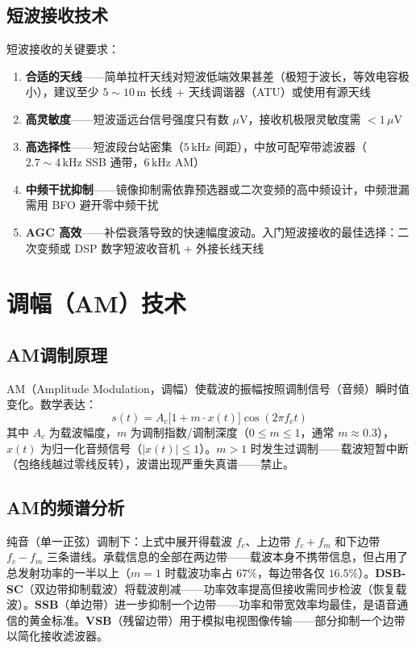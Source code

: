\documentclass[12pt,UTF8]{ctexbook}
\begin{document}
\subsection{短波接收技术}

短波接收的关键要求：
\begin{enumerate}
\item \textbf{合适的天线}——简单拉杆天线对短波低端效果甚差（极短于波长，等效电容极小），建议至少 $5\sim10\,\mathrm{m}$ 长线 + 天线调谐器（ATU）或使用有源天线
\item \textbf{高灵敏度}——短波遥远台信号强度只有数 $\mu\mathrm{V}$，接收机极限灵敏度需 $<1\,\mu\mathrm{V}$
\item \textbf{高选择性}——短波段台站密集（$5\,\mathrm{kHz}$ 间距），中放可配窄带滤波器（$2.7\sim4\,\mathrm{kHz}$ SSB 通带，$6\,\mathrm{kHz}$ AM）
\item \textbf{中频干扰抑制}——镜像抑制需依靠预选器或二次变频的高中频设计，中频泄漏需用 BFO 避开零中频干扰
\item \textbf{AGC 高效}——补偿衰落导致的快速幅度波动。入门短波接收的最佳选择：二次变频或 DSP 数字短波收音机 + 外接长线天线
\end{enumerate}

\section{调幅（AM）技术}
\label{sec:am_technology}

\subsection{AM调制原理}

AM（Amplitude Modulation，调幅）使载波的振幅按照调制信号（音频）瞬时值变化。数学表达：
\[
s(t) = A_c\big[1 + m\cdot x(t)\big]\cos(2\pi f_c t)
\]
其中 $A_c$ 为载波幅度，$m$ 为调制指数/调制深度（$0\le m\le 1$，通常 $m\approx 0.3$），$x(t)$ 为归一化音频信号（$|x(t)|\le 1$）。$m>1$ 时发生过调制——载波短暂中断（包络线越过零线反转），波谱出现严重失真谱——禁止。

\subsection{AM的频谱分析}

纯音（单一正弦）调制下：上式中展开得载波 $f_c$、上边带 $f_c+f_m$ 和下边带 $f_c-f_m$ 三条谱线。承载信息的全部在两边带——载波本身不携带信息，但占用了总发射功率的一半以上（$m=1$ 时载波功率占 $67\%$，每边带各仅 $16.5\%$）。\textbf{DSB-SC}（双边带抑制载波）将载波削减——功率效率提高但接收需同步检波（恢复载波）。\textbf{SSB}（单边带）进一步抑制一个边带——功率和带宽效率均最佳，是语音通信的黄金标准。\textbf{VSB}（残留边带）用于模拟电视图像传输——部分抑制一个边带以简化接收滤波器。
\end{document}
